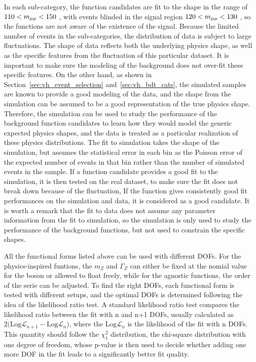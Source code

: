 In each sub-category, the function candidates are fit to the \mmm shape in the range of $110 < m_{\mu\mu} < 150$ \GeV, 
with events blinded in the signal region $120 < m_{\mu\mu} < 130$ \GeV, so the functions are not aware of the existence of the signal.
Because the limited number of events in the \VH sub-categories, the distribution of data is subject to large fluctuations.
The \mmm shape of data reflects both the underlying physics shape, as well as the specific features from the fluctuation of this particular dataset.
It is important to make sure the modeling of the background does not over-fit these specific features.
On the other hand, as shown in Section~\ref{sec:vh_event_selection} and~\ref{sec:vh_bdt_cats}, 
the simulated samples are known to provide a good modeling of the data,   
and the \mmm shape from the simulation can be assumed to be a good representation of the true physics shape.
Therefore, the simulation can be used to study the performance of the background function candidates 
to learn how they would model the generic expected physics shapes,
and the data is treated as a particular realization of these physics distributions.
The fit to simulation takes the \mmm shape of the simulation,
but assumes the statistical error in each bin as the Poisson error of the expected number of events in that bin rather than the number of simulated events in the sample.
If a function candidate provides a good fit to the simulation, it is then tested on the real dataset, 
to make sure the fit does not break down because of the fluctuation, 
If the function gives consistently good fit performances on the simulation and data, it is considered as a good candidate.
It is worth a remark that the fit to data does not assume any parameter information from the fit to simulation,
so the simulation is only used to study the performance of the background functions, but not used to constrain the specific shapes.

All the functional forms listed above can be used with different DOFs.
For the physics-inspired funtions, the $m_{Z}$ and $\Gamma_{Z}$ can either be fixed at the nomial value for the \PZ boson or allowed to float freely,
while for the agnostic functions, the order of the serie can be adjusted.
To find the right DOFs, each functional form is tested with different setups,
and the optimal DOFs is determined following the idea of the likelihood ratio test.
A standard likelihood ratio test compares the likelihood ratio between the fit with n and n+1 DOFs, 
usually calculated as $2\dot(\mathrm{Log}\mathcal{L}_{n+1}-\mathrm{Log}\mathcal{L}_{n})$, 
where the $\mathrm{Log}\mathcal{L}_{n}$ is the likelihood of the fit with n DOFs.
This quantity should follow the $\chi^{2}_{1}$ distribution, the chi-square distribution with one degree of freedom, 
whose p-value is then used to decide whether adding one more DOF in the fit leads to a significantly better fit quality.

